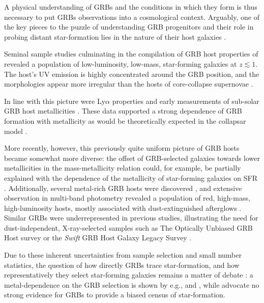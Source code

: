\documentclass[traditabstract, longauth]{aa}
\begin{document}
A physical understanding of GRBs and the conditions in which they form is thus necessary to put GRBs observations into a cosmological context. Arguably, one of the key pieces to the puzzle of understanding GRB progenitors and their role in probing distant star-formation lies in the nature of their host galaxies \citep[e.g.,][for a review]{2014PASP..126....1L}. 

Seminal sample studies \citep[e.g.,][]{2003A&A...400..499L, 2004A&A...425..913C, 2004MNRAS.352.1073T, 2010AJ....139..694L} culminating in the compilation of GRB host properties of \citet{2009ApJ...691..182S} revealed a population of low-luminosity, low-mass, star-forming galaxies at $z\lesssim1$. The host's UV emission is highly concentrated around the GRB position, and the morphologies appear more irregular than the hosts of core-collapse supernovae \citep{2006Natur.441..463F, 2010MNRAS.405...57S}. 

In line with this picture were Ly$\alpha$ properties \citep{2003A&A...406L..63F, 2012ApJ...756...25M} and early measurements of sub-solar GRB host metallicities \citep[e.g.,][]{2004ApJ...611..200P, 2005A&A...444..711G, 2005NewA...11..103S}. These data supported a strong dependence of GRB formation with metallicity \citep[e.g.,][]{2005A&A...443..581H, 2006A&A...460..199Y} as would be theoretically expected in the collapsar model \citep{1993ApJ...405..273W, 1999ApJ...524..262M}. 

More recently, however, this previously quite uniform picture of GRB hosts became somewhat more diverse: the offset of GRB-selected galaxies towards lower metallicities in the mass-metallicity relation \citep{2010AJ....140.1557L} could, for example, be partially explained with the dependence of the metallicity of star-forming galaxies on SFR \citep[e.g.,][]{2011MNRAS.414.1263M, 2011ApJ...735L...8K}. Additionally, several metal-rich GRB hosts were discovered \citep{2010ApJ...712L..26L, 2013A&A...556A..23E}, and extensive observation in multi-band photometry revealed a population of red, high-mass, high-luminosity hosts, mostly associated with dust-extinguished afterglows \citep{2011A&A...534A.108K, 2012A&A...545A..77R, 2012ApJ...756..187H, 2013ApJ...778..128P}. Similar GRBs were underrepresented in previous studies, illustrating the need for dust-independent, X-ray-selected samples such as The Optically Unbiased GRB Host survey \citep[TOUGH,][]{2012ApJ...756..187H} or the \textit{Swift} GRB Host Galaxy Legacy Survey \citep[SHOALS,][]{2015arXiv150402482P}.

Due to these inherent uncertainties from sample selection and small number statistics, the question of how directly GRBs trace star-formation, and how representatively they select star-forming galaxies remains a matter of debate \citep[e.g.,][]{2012ApJ...755...85M, 2014arXiv1409.7064V, 2015arXiv150304246S}: a metal-dependence on the GRB selection is shown by e.g., \citet{2013ApJ...774..119G} and \citet{2013ApJ...778..128P}, while \citet{2014A&A...565A.112H} advocate no strong evidence for GRBs to provide a biased census of star-formation.
 
\end{document}

